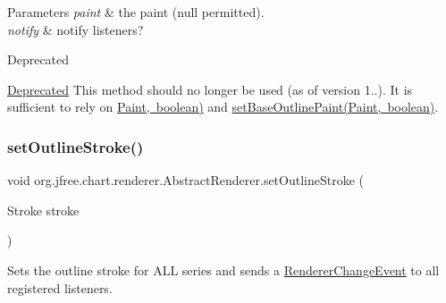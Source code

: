 \begin{DoxyParams}{Parameters}
{\em paint} & the paint ({\ttfamily null} permitted). \\
\hline
{\em notify} & notify listeners?\\
\hline
\end{DoxyParams}
\begin{DoxyRefDesc}{Deprecated}
\item[\mbox{\hyperlink{deprecated__deprecated000121}{Deprecated}}]This method should no longer be used (as of version 1..). It is sufficient to rely on \mbox{\hyperlink{}{Paint, boolean)}} and \mbox{\hyperlink{classorg_1_1jfree_1_1chart_1_1renderer_1_1_abstract_renderer_a3132fccedf5a5e1c07a003477aaf1109}{set\+Base\+Outline\+Paint(\+Paint, boolean)}}. \end{DoxyRefDesc}
\mbox{\label{classorg_1_1jfree_1_1chart_1_1renderer_1_1_abstract_renderer_a42996d497d13da2046b961fe6b5eedbb}} 
\subsubsection{\texorpdfstring{set\+Outline\+Stroke()}{setOutlineStroke()}\hspace{0.1cm}{\footnotesize\ttfamily [1/2]}}
{\footnotesize\ttfamily void org.\+jfree.\+chart.\+renderer.\+Abstract\+Renderer.\+set\+Outline\+Stroke (\begin{DoxyParamCaption}\item[{Stroke}]{stroke }\end{DoxyParamCaption})}

Sets the outline stroke for A\+LL series and sends a \mbox{\hyperlink{}{Renderer\+Change\+Event}} to all registered listeners.


